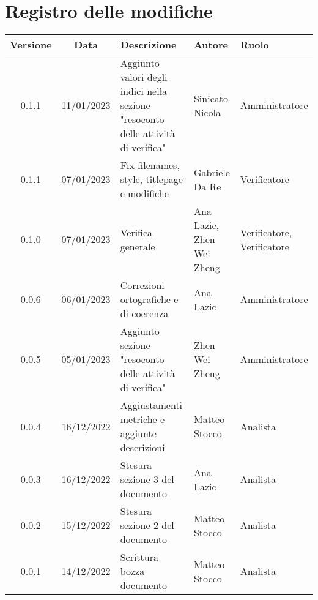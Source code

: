 \section*{Registro delle modifiche}
\begin{center}
\renewcommand\tabularxcolumn[1]{>{\Centering}m{#1}}
\begin{tabularx}{\textwidth}{| c | c | X | X | X |} 
	\hline
	\textbf{Versione} & \textbf{Data} & \textbf{Descrizione} & \textbf{Autore} & \textbf{Ruolo}\\
	\hline
	0.1.1 & 11/01/2023 & Aggiunto valori degli indici nella sezione "resoconto delle attività di verifica" & Sinicato Nicola &Amministratore \\
    \hline
	0.1.1 & 07/01/2023 & Fix filenames, style, titlepage e modifiche & Gabriele Da Re & Verificatore \\
    \hline
	0.1.0 & 07/01/2023 & Verifica generale & Ana Lazic, Zhen Wei Zheng & Verificatore, Verificatore \\
    \hline
	0.0.6 & 06/01/2023 & Correzioni ortografiche e di coerenza & Ana Lazic & Amministratore \\
	\hline
	0.0.5 & 05/01/2023 & Aggiunto sezione "resoconto delle attività di verifica" & Zhen Wei Zheng & Amministratore \\
	\hline
	0.0.4 & 16/12/2022 & Aggiustamenti metriche e aggiunte descrizioni & Matteo Stocco & Analista \\
     \hline
	0.0.3 & 16/12/2022 & Stesura sezione 3 del documento & Ana Lazic & Analista \\
	\hline
	0.0.2 & 15/12/2022 & Stesura sezione 2 del documento & Matteo Stocco & Analista \\
	\hline
	0.0.1 & 14/12/2022 & Scrittura bozza documento & Matteo Stocco & Analista \\
	\hline
	\end{tabularx}
\end{center}
